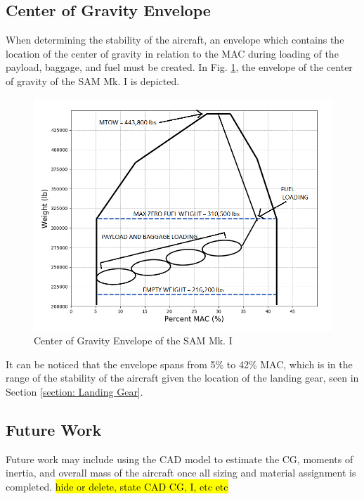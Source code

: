 \subsection{Center of Gravity Envelope}
When determining the stability of the aircraft, an envelope which contains the location of the center of gravity in relation to the MAC during loading of the payload, baggage, and fuel must be created. In Fig. \ref{fig:cg_envelope}, the envelope of the center of gravity of the SAM Mk. I is depicted.

\begin{figure}[!h]
    \centering
    \includegraphics[width=\linewidth]{Photos/massprops/CG Envelope.PNG}
    \caption{Center of Gravity Envelope of the SAM Mk. I}
    \label{fig:cg_envelope}
\end{figure}

It can be noticed that the envelope spans from 5\% to 42\% MAC, which is in the range of the stability of the aircraft given the location of the landing gear, seen in Section \ref{section: Landing Gear}.
\newpage %
\subsection{Future Work}
Future work may include using the CAD model to estimate the CG, moments of inertia, and overall mass of the aircraft once all sizing and material assignment is completed. \hl{hide or delete, state CAD CG, I, etc etc}


